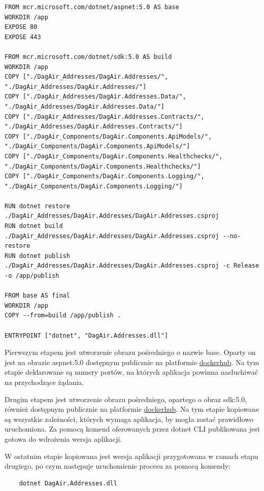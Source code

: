 \documentclass[11pt, a4]{article} %
\begin{document}
\begin{lstlisting}
FROM mcr.microsoft.com/dotnet/aspnet:5.0 AS base
WORKDIR /app
EXPOSE 80
EXPOSE 443

FROM mcr.microsoft.com/dotnet/sdk:5.0 AS build
WORKDIR /app
COPY ["./DagAir_Addresses/DagAir.Addresses/", "./DagAir_Addresses/DagAir.Addresses/"]
COPY ["./DagAir_Addresses/DagAir.Addresses.Data/", "./DagAir_Addresses/DagAir.Addresses.Data/"]
COPY ["./DagAir_Addresses/DagAir.Addresses.Contracts/", "./DagAir_Addresses/DagAir.Addresses.Contracts/"]
COPY ["./DagAir_Components/DagAir.Components.ApiModels/", "./DagAir_Components/DagAir.Components.ApiModels/"]
COPY ["./DagAir_Components/DagAir.Components.Healthchecks/", "./DagAir_Components/DagAir.Components.Healthchecks/"]
COPY ["./DagAir_Components/DagAir.Components.Logging/", "./DagAir_Components/DagAir.Components.Logging/"]

RUN dotnet restore ./DagAir_Addresses/DagAir.Addresses/DagAir.Addresses.csproj
RUN dotnet build ./DagAir_Addresses/DagAir.Addresses/DagAir.Addresses.csproj --no-restore
RUN dotnet publish ./DagAir_Addresses/DagAir.Addresses/DagAir.Addresses.csproj -c Release -o /app/publish

FROM base AS final
WORKDIR /app
COPY --from=build /app/publish .

ENTRYPOINT ["dotnet", "DagAir.Addresses.dll"]
\end{lstlisting}

Pierwszym etapem jest utworzenie obrazu pośredniego o nazwie base. Oparty on jest na obrazie 
aspnet:5.0 dostępnym publicznie na platformie 
\href{https://hub.docker.com/_/microsoft-dotnet-aspnet}{dockerhub}. Na tym etapie deklarowane są
numery portów, na których aplikacja powinna nasłuchiwać na przychodzące żądania.

Drugim etapem jest utworzenie obrazu pośredniego, opartego o obraz sdk:5.0, również dostępnym publicznie
na platformie \href{https://hub.docker.com/_/microsoft-dotnet-sdk}{dockerhub}. Na tym etapie kopiowane
są wszystkie zależności, których wymaga aplikacja, by mogła zostać prawidłowo uruchomiona.
Za pomocą komend oferowanych przez dotnet CLI publikowana jest gotowa do wdrożenia wersja aplikacji.

W ostatnim etapie kopiowana jest wersja aplikacji przygotowana w ramach etapu drugiego, po czym
następuje uruchomienie procesu za pomocą komendy:

\begin{lstlisting}
    dotnet DagAir.Addresses.dll
\end{lstlisting}
\end{document}
